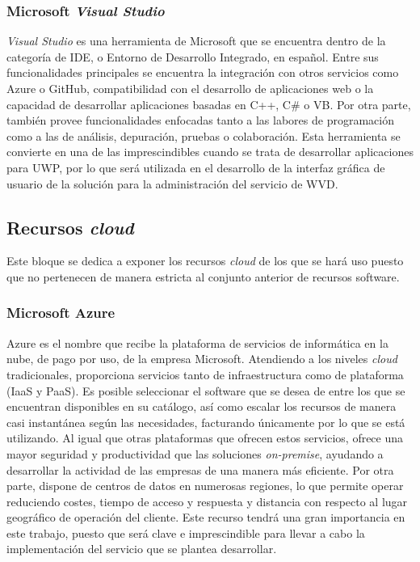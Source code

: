 \subsubsection{Microsoft \textit{Visual Studio}}
\textit{Visual Studio} \cite{visualstudio} es una herramienta de Microsoft que se encuentra dentro de la categoría de \acf{IDE}, o Entorno de Desarrollo Integrado, en español. Entre sus funcionalidades principales se encuentra la integración con otros servicios como Azure o GitHub, compatibilidad con el desarrollo de aplicaciones web o la capacidad de desarrollar aplicaciones basadas en C++, C\# o \acf{VB}. Por otra parte, también provee funcionalidades enfocadas tanto a las labores de programación como a las de análisis, depuración, pruebas o colaboración. Esta herramienta se convierte en una de las imprescindibles cuando se trata de desarrollar aplicaciones para \acf{UWP}, por lo que será utilizada en el desarrollo de la interfaz gráfica de usuario de la solución para la administración del servicio de \acf{WVD}.

\clearpage

\subsection{Recursos \textit{cloud}}
Este bloque se dedica a exponer los recursos \textit{cloud} de los que se hará uso puesto que no pertenecen de manera estricta al conjunto anterior de recursos software.

\subsubsection{Microsoft Azure}
Azure \cite{queesazure} es el nombre que recibe la plataforma de servicios de informática en la nube, de pago por uso, de la empresa Microsoft. Atendiendo a los niveles \textit{cloud} tradicionales, proporciona servicios tanto de infraestructura como de plataforma (\acs{IaaS} y \acs{PaaS}). Es posible seleccionar el software que se desea de entre los que se encuentran disponibles en su catálogo, así como escalar los recursos de manera casi instantánea según las necesidades, facturando únicamente por lo que se está utilizando. Al igual que otras plataformas que ofrecen estos servicios, ofrece una mayor seguridad y productividad que las soluciones \textit{on-premise}, ayudando a desarrollar la actividad de las empresas de una manera más eficiente. Por otra parte, dispone de centros de datos en numerosas regiones, lo que permite operar reduciendo costes, tiempo de acceso y respuesta y distancia con respecto al lugar geográfico de operación del cliente. Este recurso tendrá una gran importancia en este trabajo, puesto que será clave e imprescindible para llevar a cabo la implementación del servicio que se plantea desarrollar.

